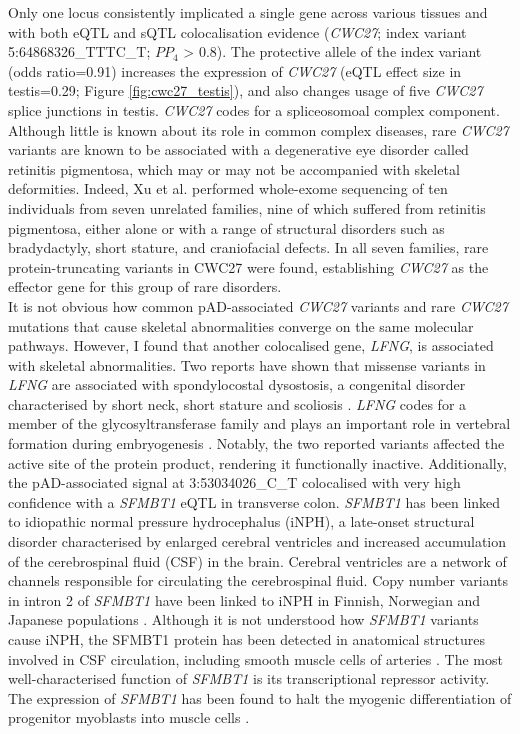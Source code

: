   Only one locus consistently implicated a single gene across various tissues and with both eQTL and sQTL colocalisation evidence (\textit{CWC27}; index variant 5:64868326\_TTTC\_T; $PP_{4}$ > 0.8). The protective allele of the index variant (odds ratio=0.91) increases the expression of \textit{CWC27} (eQTL effect size in testis=0.29; Figure \ref{fig:cwc27_testis}), and also changes usage of five \textit{CWC27} splice junctions in testis. \textit{CWC27} codes for a spliceosomoal complex component. Although little is known about its role in common complex diseases, rare \textit{CWC27} variants are known to be associated with a degenerative eye disorder called retinitis pigmentosa, which may or may not be accompanied with skeletal deformities. Indeed, Xu et al. \cite{Xu2017-tf} performed whole-exome sequencing of ten individuals from seven unrelated families, nine of which suffered from retinitis pigmentosa, either alone or with a range of structural disorders such as bradydactyly, short stature, and craniofacial defects. In all seven families, rare protein-truncating variants in CWC27 were found, establishing \textit{CWC27} as the effector gene for this group of rare disorders.\\

  It is not obvious how common pAD-associated \textit{CWC27} variants and rare \textit{CWC27} mutations that cause skeletal abnormalities converge on the same molecular pathways. However, I found that another colocalised gene, \textit{LFNG}, is associated with skeletal abnormalities. Two reports have shown that missense variants in \textit{LFNG} are associated with spondylocostal dysostosis, a congenital disorder characterised by short neck, short stature and scoliosis \cite{Otomo2019-os,Sparrow2006-vq}. \textit{LFNG} codes for a member of the glycosyltransferase family and plays an important role in vertebral formation during embryogenesis \cite{Serth2003-kn}. Notably, the two reported variants affected the active site of the protein product, rendering it functionally inactive. Additionally, the pAD-associated signal at 3:53034026\_C\_T colocalised with very high confidence with a \textit{SFMBT1} eQTL in transverse colon. \textit{SFMBT1} has been linked to idiopathic normal pressure hydrocephalus (iNPH), a late-onset structural disorder characterised by enlarged cerebral ventricles and increased accumulation of the cerebrospinal fluid (CSF) in the brain.  Cerebral ventricles are a network of channels responsible for circulating the cerebrospinal fluid. Copy number variants in intron 2 of \textit{SFMBT1} have been linked to iNPH in Finnish, Norwegian and Japanese populations \cite{Korhonen2018-fc,Sato2016-yj}. Although it is not understood how \textit{SFMBT1} variants cause iNPH, the SFMBT1 protein has been detected in anatomical structures involved in CSF circulation, including smooth muscle cells of arteries \cite{Kato2011-xj}. The most well-characterised function of \textit{SFMBT1} is its transcriptional repressor activity. The expression of \textit{SFMBT1} has been found to halt the myogenic differentiation of progenitor myoblasts into muscle cells \cite{Lin2013-ga}. \\
  
